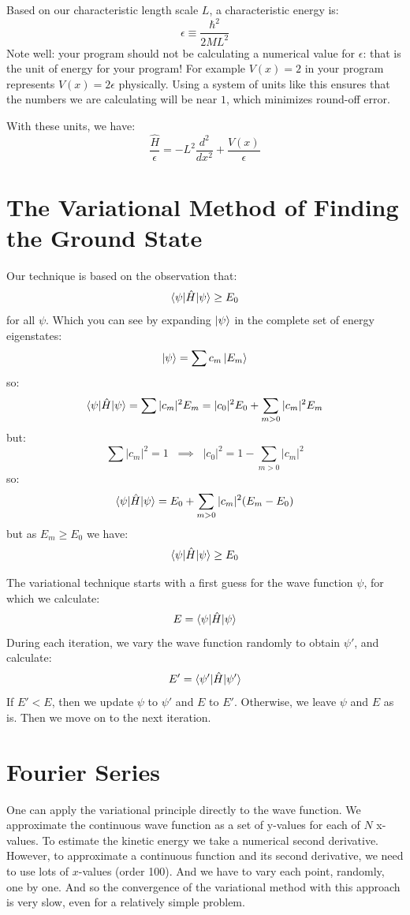 \documentclass[12pt]{article}
\begin{document}
Based on our characteristic length scale $L$, a characteristic energy is:
\begin{equation}
\epsilon \equiv \frac{\hbar^2}{2 M L^2}
\end{equation}
Note well:  your program should not be calculating a numerical value for
$\epsilon$: that is the unit of energy for your program!  For example
$V(x) = 2$ in your program represents $V(x) = 2 \epsilon$
physically.  Using a system of units like this ensures that the
numbers we are calculating will be near $1$, which minimizes round-off
error.

With these units, we have:
\begin{equation}
\frac{\hat{H}}{\epsilon} = -L^2\frac{d^2}{dx^2} + \frac{V(x)}{\epsilon}
\end{equation}

\section{The Variational Method of Finding the Ground State}

Our technique is based on the observation that:
$$\braket{\psi|\hat{H}|\psi} \geq E_0$$
for all $\psi$.  Which you can see by expanding $\ket{\psi}$ in the complete set of energy eigenstates:
$$\ket{\psi} = \sum c_m \ket{E_m}$$
so:
$$\braket{\psi|\hat{H}|\psi} = \sum |c_m|^2 E_m = |c_0|^2 E_0 + \sum_{m>0} |c_m|^2 E_m$$
but:
$$\sum |c_m|^2 = 1 \;\; \implies \;\; |c_0|^2 = 1 - \sum_{m>0} |c_m|^2$$
so:
$$\braket{\psi|\hat{H}|\psi} = E_0 + \sum_{m>0} |c_m|^2 (E_m - E_0)$$
but as $E_m \geq E_0$ we have:
$$\braket{\psi|\hat{H}|\psi} \geq E_0$$

The variational technique starts with a first guess for the wave function $\psi$, for which we calculate:
$$E=\braket{\psi|\hat{H}|\psi}$$
During each iteration, we vary the wave function randomly to
obtain $\psi'$, and calculate:
$$E'=\braket{\psi'|\hat{H}|\psi'}$$
If $E' < E$, then we update $\psi$ to $\psi'$ and $E$ to $E'$.
Otherwise, we leave $\psi$ and $E$ as is.  Then we move on to the next
iteration.

\section{Fourier Series}

One can apply the variational principle directly to the wave function.
We approximate the continuous wave function as a set of y-values for
each of $N$ x-values.  To estimate the kinetic energy we take a
numerical second derivative.  However, to approximate a continuous
function and its second derivative, we need to use lots of $x$-values
(order 100).  And we have to vary each point, randomly, one by one.
And so the convergence of the variational method with this approach is
very slow, even for a relatively simple problem.
\end{document}
